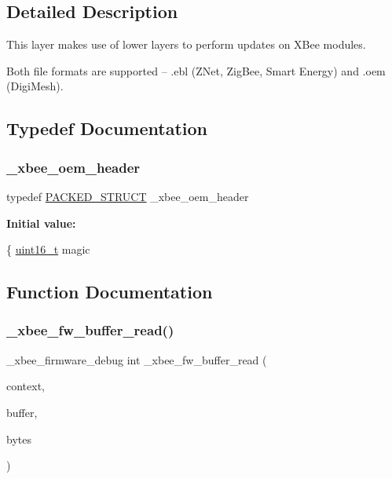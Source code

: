 \subsection{Detailed Description}
This layer makes use of lower layers to perform updates on X\+Bee modules. 

Both file formats are supported -- .ebl (Z\+Net, Zig\+Bee, Smart Energy) and .oem (Digi\+Mesh). 

\subsection{Typedef Documentation}
\mbox{\label{group__xbee__firmware_gadac4f2ab2bea98ef37c8f49b61817ae5}} 
\subsubsection{\texorpdfstring{\+\_\+xbee\+\_\+oem\+\_\+header}{\_xbee\_oem\_header}}
{\footnotesize\ttfamily typedef \hyperlink{group___s_x_a_ga4233297bd31be5c273d4fb0758cc54d7}{P\+A\+C\+K\+E\+D\+\_\+\+S\+T\+R\+U\+CT} \+\_\+xbee\+\_\+oem\+\_\+header}

{\bfseries Initial value\+:}
\begin{DoxyCode}
\{
   \hyperlink{group__hal__dos_ga5a8b2dc9e45a9ee81a94ef304fb62505}{uint16\_t}        magic
\end{DoxyCode}


\subsection{Function Documentation}
\mbox{\label{group__xbee__firmware_ga3e528e574ae73a5f8bbc8b2783f04c4f}} 
\subsubsection{\texorpdfstring{\+\_\+xbee\+\_\+fw\+\_\+buffer\+\_\+read()}{\_xbee\_fw\_buffer\_read()}}
{\footnotesize\ttfamily \+\_\+xbee\+\_\+firmware\+\_\+debug int \+\_\+xbee\+\_\+fw\+\_\+buffer\+\_\+read (\begin{DoxyParamCaption}\item[{void \hyperlink{group__hal_gaef060b3456fdcc093a7210a762d5f2ed}{F\+AR} $\ast$}]{context,  }\item[{void \hyperlink{group__hal_gaef060b3456fdcc093a7210a762d5f2ed}{F\+AR} $\ast$}]{buffer,  }\item[{\hyperlink{group__hal__dos_ga2140805d08462d474b82ddc8d1c2f3e6}{int16\+\_\+t}}]{bytes }\end{DoxyParamCaption})}



